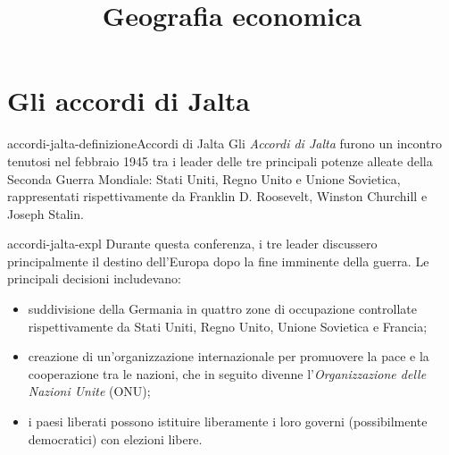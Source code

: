 \documentclass[preview]{standalone}
\begin{document}
\title{Geografia economica}
\genpage

\section{Gli accordi di Jalta}

\begin{snippetdefinition}{accordi-jalta-definizione}{Accordi di Jalta}
    Gli \textit{Accordi di Jalta} furono un incontro tenutosi nel febbraio 1945 tra i leader delle tre principali potenze alleate della Seconda Guerra Mondiale: Stati Uniti, Regno Unito e Unione Sovietica, rappresentati rispettivamente da Franklin D. Roosevelt, Winston Churchill e Joseph Stalin.
\end{snippetdefinition}

\begin{snippet}{accordi-jalta-expl}
    Durante questa conferenza, i tre leader discussero principalmente il destino dell'Europa dopo la fine imminente della guerra. Le principali decisioni includevano:

    \begin{itemize}
        \item suddivisione della Germania in quattro zone di occupazione controllate rispettivamente
            da Stati Uniti, Regno Unito, Unione Sovietica e Francia;
        \item creazione di un'organizzazione internazionale per promuovere la pace e la cooperazione tra le nazioni, che in seguito divenne l'\textit{Organizzazione delle Nazioni Unite} (ONU);
        \item i paesi liberati possono istituire liberamente i loro governi (possibilmente democratici) con elezioni libere.
    \end{itemize}
\end{snippet}
\end{document}
